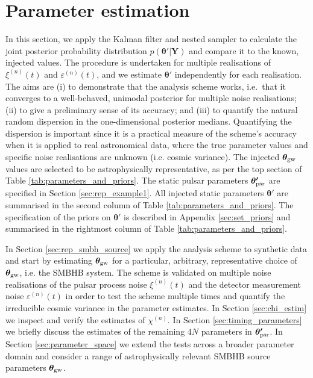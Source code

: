 \documentclass[fleqn,usenatbib,useAMS]{mnras}
\begin{document}
 
\section{Parameter estimation} \label{sec:pe_and_ms} 
In this section, we apply the Kalman filter and nested sampler to calculate the joint posterior probability distribution $p({\boldsymbol{\theta'}} | {\boldsymbol{Y}})$ and compare it to the known, injected values. The procedure is undertaken for multiple realisations of $\xi^{(n)}(t)$ and $\varepsilon^{(n)}(t)$, and we estimate $\boldsymbol{\theta'}$ independently for each realisation. The aims are (i) to demonstrate that the analysis scheme works, i.e.\ that it converges to a well-behaved, unimodal posterior for multiple noise realisations; (ii) to give a preliminary sense of its accuracy; and (iii) to quantify the natural random dispersion in the one-dimensional posterior medians. Quantifying the dispersion is important since it is a practical measure of the scheme's accuracy when it is applied to real astronomical data, where the true parameter values and specific noise realisations are unknown (i.e. cosmic variance). The injected $\boldsymbol{\theta}_{\rm gw}$ values are selected to be astrophysically representative, as per the top section of Table \ref{tab:parameters_and_priors}. The static pulsar parameters $\boldsymbol{\theta'}_{\rm psr}$ are specified in Section \ref{sec:rep_example1}. All injected static parameters $\boldsymbol{\theta}'$ are summarised in the second column of Table \ref{tab:parameters_and_priors}. The specification of the priors on $\boldsymbol{\theta'}$ is described in Appendix \ref{sec:set_priors} and summarised in the rightmost column of Table \ref{tab:parameters_and_priors}. \newline 

In Section \ref{sec:rep_smbh_source} we apply the analysis scheme to synthetic data and start by estimating $\boldsymbol{\theta}_{\rm gw}$ for a  particular, arbitrary, representative choice of $\boldsymbol{\theta}_{\rm gw}$, i.e. the SMBHB system. The scheme is validated on multiple noise realisations of the pulsar process noise $\xi^{(n)}(t)$ and the detector measurement noise $\varepsilon^{(n)}(t)$ in order to test the scheme multiple times and quantify the  irreducible cosmic variance in the parameter estimates. In Section \ref{sec:chi_estim} we inspect and verify the estimates of  $\chi^{(n)}$. In Section \ref{sec:timing_parameters} we briefly discuss the estimates of the remaining $4N$ parameters in $\boldsymbol{\theta'}_{\rm psr}$. In Section \ref{sec:parameter_space} we extend the tests across a broader parameter domain and consider a range of astrophysically relevant SMBHB source parameters $\boldsymbol{\theta}_{\rm gw}$. 
\end{document}

